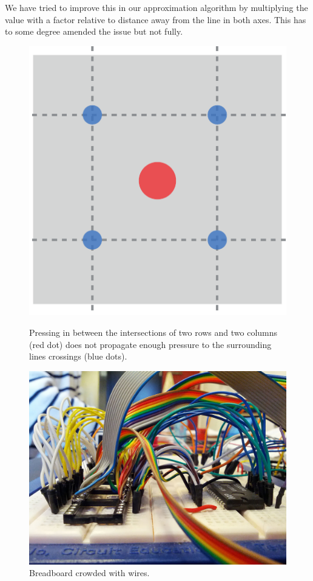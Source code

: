 We have tried to improve this in our approximation algorithm by multiplying the value with a factor relative to distance away from the line in both axes.
This has to some degree amended the issue but not fully.

\begin{figure}
\centering
\begin{minipage}[t]{.45\textwidth}
  \centering
  \includegraphics[width=.9\linewidth]{figures/touch/intersections}
  \caption[Pressing in between the intersection of two rows and two columns does not propagate enough pressure.]
  {Pressing in between the intersections of two rows and two columns (red dot) does not propagate enough pressure to the surrounding lines crossings (blue dots).}
  \label{fig:textiletouch:intersections}
\end{minipage}%
\hspace{1cm}
\begin{minipage}[t]{.45\textwidth}
  \centering
  \includegraphics[width=.9\linewidth]{figures/touch/wires}
  \caption[Breadboard crowded with wires.]
  {Breadboard crowded with wires.}
  \label{fig:textiletouch:wires}
\end{minipage}
\end{figure}

